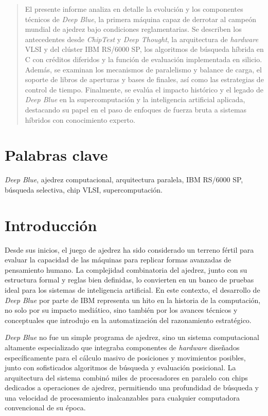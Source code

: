 \documentclass[a4paper, 12pt]{article}
\begin{document}
\begin{abstract}
    El presente informe analiza en detalle la evolución y los 
    componentes técnicos de \textit{Deep Blue}, la primera 
    máquina capaz de derrotar al campeón mundial de ajedrez 
    bajo condiciones reglamentarias. Se describen los 
    antecedentes desde \emph{ChipTest} y \emph{Deep Thought}, la arquitectura 
    de \emph{hardware} VLSI y del clúster IBM RS/6000 SP, los 
    algoritmos de búsqueda híbrida en C con créditos diferidos y 
    la función de evaluación implementada en silicio. Además, 
    se examinan los mecanismos de paralelismo y balance de carga, 
    el soporte de libros de aperturas y bases de finales, así 
    como las estrategias de control de tiempo. Finalmente, se 
    evalúa el impacto histórico y el legado de \textit{Deep Blue} 
    en la supercomputación y la inteligencia artificial aplicada, 
    destacando su papel en el paso de enfoques de fuerza bruta a 
    sistemas híbridos con conocimiento experto.
\end{abstract}

\section*{Palabras clave}
\textit{Deep Blue}, 
ajedrez computacional, 
arquitectura paralela, 
IBM RS/6000 SP, 
búsqueda selectiva,
chip VLSI,
supercomputación.
    

\newpage
\section{Introducción}

Desde sus inicios, el juego de ajedrez ha sido considerado un 
terreno fértil para evaluar la capacidad de las máquinas para 
replicar formas avanzadas de pensamiento humano. La complejidad 
combinatoria del ajedrez, junto con su estructura formal y 
reglas bien definidas, lo convierten en un banco de pruebas 
ideal para los sistemas de inteligencia artificial. En este 
contexto, el desarrollo de \textit{Deep Blue} por parte de IBM 
representa un hito en la historia de la computación, no solo por 
su impacto mediático, sino también por los avances técnicos y 
conceptuales que introdujo en la automatización del razonamiento 
estratégico.

\textit{Deep Blue} no fue un simple programa de ajedrez, sino un 
sistema computacional altamente especializado que integraba 
componentes de \emph{hardware} diseñados específicamente para el 
cálculo masivo de posiciones y movimientos posibles, junto con 
sofisticados algoritmos de búsqueda y evaluación posicional. La 
arquitectura del sistema combinó miles de procesadores en 
paralelo con chips dedicados a operaciones de ajedrez, 
permitiendo una profundidad de búsqueda y una velocidad de 
procesamiento inalcanzables para cualquier computadora 
convencional de su época.
\end{document}
